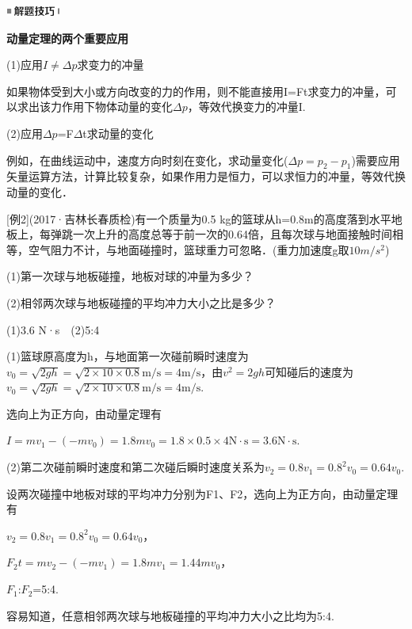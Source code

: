 \begin{center}\includegraphics[width=0.70764in,height=0.12292in]{media/image37.png}

\textbf{动量定理的两个重要应用}
\end{center}

(1)应用$I\neq \Delta p$求变力的冲量

如果物体受到大小或方向改变的力的作用，则不能直接用I=Ft求变力的冲量，可以求出该力作用下物体动量的变化$\Delta p$，等效代换变力的冲量I.

(2)应用$\Delta p$=F$\Delta$t求动量的变化

例如，在曲线运动中，速度方向时刻在变化，求动量变化($\Delta p=p_2-p_1$)需要应用矢量运算方法，计算比较复杂，如果作用力是恒力，可以求恒力的冲量，等效代换动量的变化．

{[}例2{]}(2017·吉林长春质检)有一个质量为0.5 kg的篮球从h=0.8m的高度落到水平地板上，每弹跳一次上升的高度总等于前一次的0.64倍，且每次球与地面接触时间相等，空气阻力不计，与地面碰撞时，篮球重力可忽略．(重力加速度g取$10m/s^2$)

(1)第一次球与地板碰撞，地板对球的冲量为多少？

(2)相邻两次球与地板碰撞的平均冲力大小之比是多少？

\begin{solution}
	(1)3.6 N·s　(2)5:4
	
	(1)篮球原高度为h，与地面第一次碰前瞬时速度为$v_{0}=\sqrt{2 g h}=\sqrt{2 \times 10 \times 0.8} \mathrm{m} / \mathrm{s}=4 \mathrm{m} / \mathrm{s}$，由$v^2=2gh$可知碰后的速度为$v_{0}=\sqrt{2 g h}=\sqrt{2 \times 10 \times 0.8} \mathrm{m} / \mathrm{s}=4 \mathrm{m} / \mathrm{s}$.

选向上为正方向，由动量定理有

$I=m v_{1}-\left(-m v_{0}\right)=1.8 m v_{0}=1.8 \times 0.5 \times 4 \mathrm{N} \cdot \mathrm{s}=3.6 \mathrm{N} \cdot \mathrm{s}$.

(2)第二次碰前瞬时速度和第二次碰后瞬时速度关系为$v_{2}=0.8 v_{1}=0.8^{2} v_{0}=0.64 v_{0}$.

设两次碰撞中地板对球的平均冲力分别为F1、F2，选向上为正方向，由动量定理有

$v_{2}=0.8 v_{1}=0.8^{2} v_{0}=0.64 v_{0}$，

$F_{2} t=m v_{2}-\left(-m v_{1}\right)=1.8 m v_{1}=1.44 m v_{0}$，

$F_1$:$F_2$=5:4.

容易知道，任意相邻两次球与地板碰撞的平均冲力大小之比均为5:4.
\end{solution}


